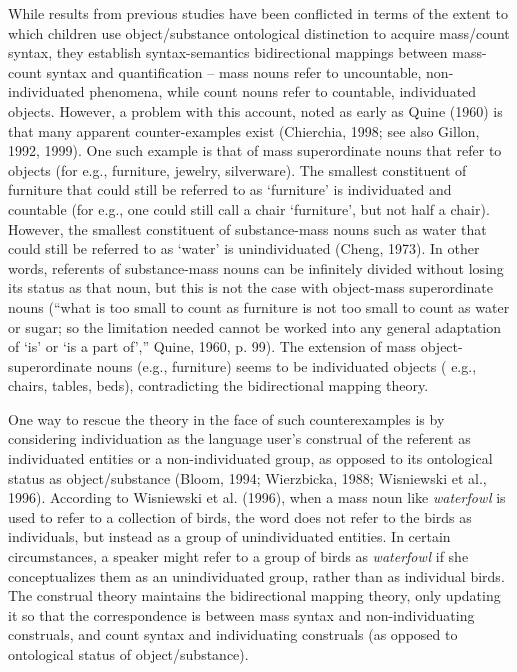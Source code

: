 \documentclass[
  man,floatsintext]{apa6}
\begin{document}
While results from previous studies have been conflicted in terms of the extent to which children use object/substance ontological distinction to acquire mass/count syntax, they establish syntax-semantics bidirectional mappings between mass-count syntax and quantification -- mass nouns refer to uncountable, non-individuated phenomena, while count nouns refer to countable, individuated objects. However, a problem with this account, noted as early as Quine (1960) is that many apparent counter-examples exist (Chierchia, 1998; see also Gillon, 1992, 1999). One such example is that of mass superordinate nouns that refer to objects (for e.g., furniture, jewelry, silverware). The smallest constituent of furniture that could still be referred to as `furniture' is individuated and countable (for e.g., one could still call a chair `furniture', but not half a chair). However, the smallest constituent of substance-mass nouns such as water that could still be referred to as `water' is unindividuated (Cheng, 1973). In other words, referents of substance-mass nouns can be infinitely divided without losing its status as that noun, but this is not the case with object-mass superordinate nouns (``what is too small to count as furniture is not too small to count as water or sugar; so the limitation needed cannot be worked into any general adaptation of `is' or `is a part of','' Quine, 1960, p. 99). The extension of mass object-superordinate nouns (e.g., furniture) seems to be individuated objects ( e.g., chairs, tables, beds), contradicting the bidirectional mapping theory.

One way to rescue the theory in the face of such counterexamples is by considering individuation as the language user's construal of the referent as individuated entities or a non-individuated group, as opposed to its ontological status as object/substance (Bloom, 1994; Wierzbicka, 1988; Wisniewski et al., 1996). According to Wisniewski et al. (1996), when a mass noun like \emph{waterfowl} is used to refer to a collection of birds, the word does not refer to the birds as individuals, but instead as a group of unindividuated entities. In certain circumstances, a speaker might refer to a group of birds as \emph{waterfowl} if she conceptualizes them as an unindividuated group, rather than as individual birds. The construal theory maintains the bidirectional mapping theory, only updating it so that the correspondence is between mass syntax and non-individuating construals, and count syntax and individuating construals (as opposed to ontological status of object/substance).
\end{document}
